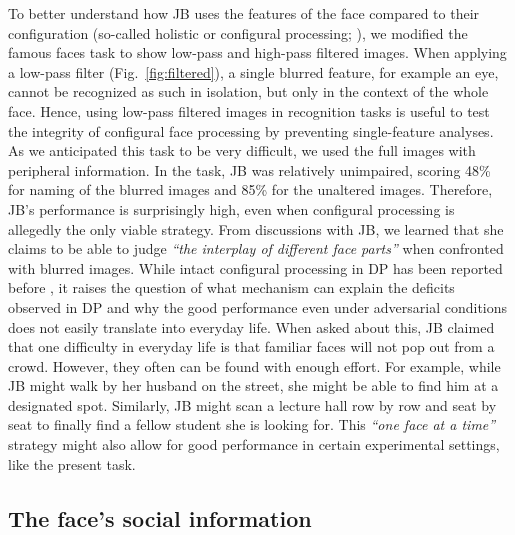 \documentclass[fleqn,10pt]{SelfArx} %
\begin{document}
To better understand how JB uses the features of the face compared to their configuration (so-called holistic or configural processing; \citet{Maurer_2002}), we modified the famous faces task to show low-pass and high-pass filtered images. When applying a low-pass filter (Fig.~\ref{fig:filtered}), a single blurred feature, for example an eye, cannot be recognized as such in isolation, but only in the context of the whole face. Hence, using low-pass filtered images in recognition tasks is useful to test the integrity of configural face processing by preventing single-feature analyses. As we anticipated this task to be very difficult, we used the full images with peripheral information. In the task, JB was relatively unimpaired, scoring 48\% for naming of the blurred images and 85\% for the unaltered images. Therefore, JB's performance is surprisingly high, even when configural processing is allegedly the only viable strategy. From discussions with JB, we learned that she claims to be able to judge \textit{“the interplay of different face parts”} when confronted with blurred images. While intact configural processing in DP has been reported before \citep{Duchaine_2000, Le_Grand_2006}, it raises the question of what mechanism can explain the deficits observed in DP and why the good performance even under adversarial conditions does not easily translate into everyday life. When asked about this, JB claimed that one difficulty in everyday life is that familiar faces will not pop out from a crowd. However, they often can be found with enough effort. For example, while JB might walk by her husband on the street, she might be able to find him at a designated spot. Similarly, JB might scan a lecture hall row by row and seat by seat to finally find a fellow student she is looking for. This \textit{“one face at a time”} strategy might also allow for good performance in certain experimental settings, like the present task.


\subsection*{The face's social information}
\end{document}
